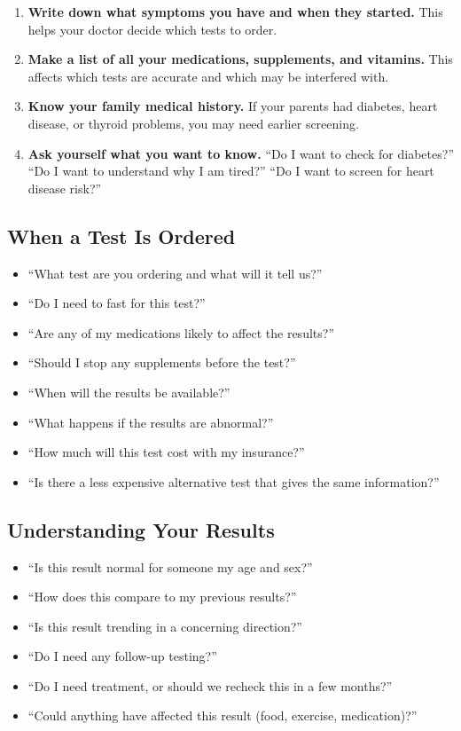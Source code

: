 \begin{enumerate}
    \item \textbf{Write down what symptoms you have and when they started.} This helps your doctor decide which tests to order.
    \item \textbf{Make a list of all your medications, supplements, and vitamins.} This affects which tests are accurate and which may be interfered with.
    \item \textbf{Know your family medical history.} If your parents had diabetes, heart disease, or thyroid problems, you may need earlier screening.
    \item \textbf{Ask yourself what you want to know.} ``Do I want to check for diabetes?'' ``Do I want to understand why I am tired?'' ``Do I want to screen for heart disease risk?''
\end{enumerate}

\subsection{When a Test Is Ordered}

\begin{itemize}
    \item ``What test are you ordering and what will it tell us?''
    \item ``Do I need to fast for this test?''
    \item ``Are any of my medications likely to affect the results?''
    \item ``Should I stop any supplements before the test?''
    \item ``When will the results be available?''
    \item ``What happens if the results are abnormal?''
    \item ``How much will this test cost with my insurance?''
    \item ``Is there a less expensive alternative test that gives the same information?''
\end{itemize}

\subsection{Understanding Your Results}

\begin{itemize}
    \item ``Is this result normal for someone my age and sex?''
    \item ``How does this compare to my previous results?''
    \item ``Is this result trending in a concerning direction?''
    \item ``Do I need any follow-up testing?''
    \item ``Do I need treatment, or should we recheck this in a few months?''
    \item ``Could anything have affected this result (food, exercise, medication)?''
\end{itemize}

